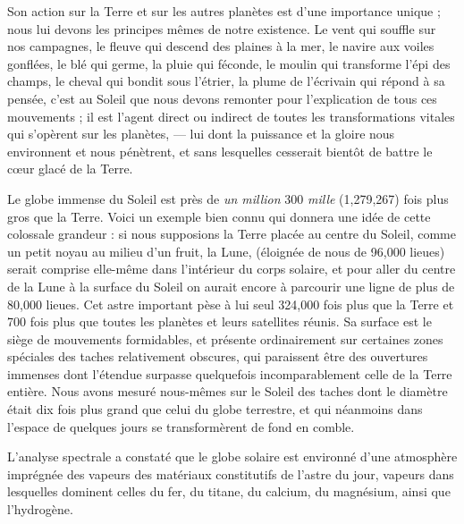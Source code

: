 \documentclass[a4paper, 11pt, oneside]{article}
\begin{document}
Son action sur la Terre et sur les autres planètes est d'une importance unique ; nous lui devons les principes mêmes de notre existence. Le vent qui souffle sur nos campagnes, le fleuve qui descend des plaines à la mer, le navire aux voiles gonflées, le blé qui germe, la pluie qui féconde, le moulin qui transforme l'épi des champs, le cheval qui bondit sous l'étrier, la plume de l'écrivain qui répond à sa pensée, c'est au Soleil que nous devons remonter pour l'explication de tous ces mouvements ; il est l'agent direct ou indirect de toutes les transformations vitales qui s'opèrent sur les planètes, --- lui dont la puissance et la gloire nous environnent et nous pénètrent, et sans lesquelles cesserait bientôt de battre le cœur glacé de la Terre.

Le globe immense du Soleil est près de \emph{un million} 300 \emph{mille} (1,279,267) fois plus gros que la Terre. Voici un exemple bien connu qui donnera une idée de cette colossale grandeur : si nous supposions la Terre placée au centre du Soleil, comme un petit noyau au milieu d'un fruit, la Lune, (éloignée de nous de 96,000 lieues) serait comprise elle-même dans l'intérieur du corps solaire, et pour aller du centre de la Lune à la surface du Soleil on aurait encore à parcourir une ligne de plus de 80,000 lieues. Cet astre important pèse à lui seul 324,000 fois plus que la Terre et 700 fois plus que toutes les planètes et leurs satellites réunis. Sa surface est le siège de mouvements formidables, et présente ordinairement sur certaines zones spéciales des taches relativement obscures, qui paraissent être des ouvertures immenses dont l'étendue surpasse quelquefois incomparablement celle de la Terre entière. Nous avons mesuré nous-mêmes sur le Soleil des taches dont le diamètre était dix fois plus grand que celui du globe terrestre, et qui néanmoins dans l'espace de quelques jours se transformèrent de fond en comble.

L'analyse spectrale a constaté que le globe solaire est environné d'une atmosphère imprégnée des vapeurs des matériaux constitutifs de l'astre du jour, vapeurs dans lesquelles dominent celles du fer, du titane, du calcium, du magnésium, ainsi que l'hydrogène.
\end{document}
